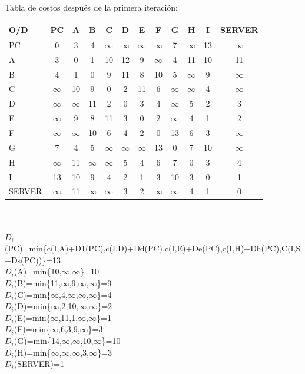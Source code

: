 \documentclass{article}
\begin{document}
Tabla de costos despu\'es de la primera iteraci\'on:\\
\begin{tabular}{||l | c | c | c | c | c | c | c | c | c | c | c ||}
\hline
\hline
O/D & PC & A & B & C & D & E & F & G & H & I & SERVER \\
\hline
PC & 0 & 3 & 4 & $\infty$ & $\infty$ & $\infty$ & $\infty$ & 7 & $\infty$ & 13 & $\infty$ \\
\hline
A & 3 & 0 & 1 & 10 & 12 & 9 & $\infty$ & 4 & 11 & 10 & 11 \\
\hline
B & 4 & 1 & 0 & 9 & 11 & 8 & 10 & 5 & $\infty$ & 9 & $\infty$ \\
\hline
C & $\infty$ & 10 & 9 & 0 & 2 & 11 & 6 & $\infty$ & $\infty$ & 4 & $\infty$ \\
\hline
D & $\infty$ & $\infty$ & 11 & 2 & 0 & 3 & 4 & $\infty$ & 5 & 2 & 3 \\
\hline
E & $\infty$ & 9 & 8 & 11 & 3 & 0 & 2 & $\infty$ & 4 & 1 & 2 \\
\hline
F & $\infty$ & $\infty$ & 10 & 6 & 4 & 2 & 0 & 13 & 6 & 3 & $\infty$ \\
\hline
G & 7 & 4 & 5 & $\infty$ & $\infty$ & $\infty$ & 13 & 0 & 7 & 10 & $\infty$ \\
\hline
H & $\infty$ & 11 & $\infty$ & $\infty$ & 5 & 4 & 6 & 7 & 0 & 3 & 4 \\
\hline
I & 13 & 10 & 9 & 4 & 2 & 1 & 3 & 10 & 3 & 0 & 1 \\
\hline
SERVER & $\infty$ & 11 & $\infty$ & $\infty$ & 3 & 2 & $\infty$ & $\infty$ & 4 & 1 & 0 \\
\hline
\end{tabular}\\\\

$D_i$(PC)=min\{c(I,A)+D1(PC),c(I,D)+Dd(PC),c(I,E)+De(PC),c(I,H)+Dh(PC),C(I,S+Ds(PC))\}=13\\
$D_i$(A)=min\{10,$\infty$,$\infty$\}=10\\
$D_i$(B)=min\{11,$\infty$,9,$\infty$,$\infty$\}=9\\
$D_i$(C)=min\{$\infty$,4,$\infty$,$\infty$,$\infty$\}=4\\
$D_i$(D)=min\{$\infty$,2,10,$\infty$,$\infty$\}=2\\
$D_i$(E)=min\{$\infty$,11,1,$\infty$,$\infty$\}=1\\
$D_i$(F)=min\{$\infty$,6,3,9,$\infty$\}=3\\
$D_i$(G)=min\{14,$\infty$,$\infty$,10,$\infty$\}=10\\
$D_i$(H)=min\{$\infty$,$\infty$,$\infty$,3,$\infty$\}=3\\
$D_i$(SERVER)=1\\
\end{document}
